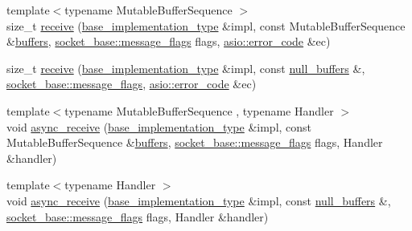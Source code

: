\begin{DoxyCompactItemize}
\item 
{\footnotesize template$<$typename Mutable\+Buffer\+Sequence $>$ }\\size\+\_\+t \hyperlink{classasio_1_1detail_1_1reactive__socket__service__base_a5b023546d28a8b111a9661f7a2ab30c6}{receive} (\hyperlink{structasio_1_1detail_1_1reactive__socket__service__base_1_1base__implementation__type}{base\+\_\+implementation\+\_\+type} \&impl, const Mutable\+Buffer\+Sequence \&\hyperlink{group__async__read_ga54dede45c3175148a77fe6635222c47d}{buffers}, \hyperlink{classasio_1_1socket__base_ac3cf77465dfedfe1979b5415cf32cc94}{socket\+\_\+base\+::message\+\_\+flags} flags, \hyperlink{classasio_1_1error__code}{asio\+::error\+\_\+code} \&ec)
\item 
size\+\_\+t \hyperlink{classasio_1_1detail_1_1reactive__socket__service__base_ad0803c43d3ce18ca81b3a4182f55f3e5}{receive} (\hyperlink{structasio_1_1detail_1_1reactive__socket__service__base_1_1base__implementation__type}{base\+\_\+implementation\+\_\+type} \&impl, const \hyperlink{classasio_1_1null__buffers}{null\+\_\+buffers} \&, \hyperlink{classasio_1_1socket__base_ac3cf77465dfedfe1979b5415cf32cc94}{socket\+\_\+base\+::message\+\_\+flags}, \hyperlink{classasio_1_1error__code}{asio\+::error\+\_\+code} \&ec)
\item 
{\footnotesize template$<$typename Mutable\+Buffer\+Sequence , typename Handler $>$ }\\void \hyperlink{classasio_1_1detail_1_1reactive__socket__service__base_a9d94d609d54b90f323d744b6d0a185ad}{async\+\_\+receive} (\hyperlink{structasio_1_1detail_1_1reactive__socket__service__base_1_1base__implementation__type}{base\+\_\+implementation\+\_\+type} \&impl, const Mutable\+Buffer\+Sequence \&\hyperlink{group__async__read_ga54dede45c3175148a77fe6635222c47d}{buffers}, \hyperlink{classasio_1_1socket__base_ac3cf77465dfedfe1979b5415cf32cc94}{socket\+\_\+base\+::message\+\_\+flags} flags, Handler \&handler)
\item 
{\footnotesize template$<$typename Handler $>$ }\\void \hyperlink{classasio_1_1detail_1_1reactive__socket__service__base_a5140d8ba31369be14ca2f181163e3ba1}{async\+\_\+receive} (\hyperlink{structasio_1_1detail_1_1reactive__socket__service__base_1_1base__implementation__type}{base\+\_\+implementation\+\_\+type} \&impl, const \hyperlink{classasio_1_1null__buffers}{null\+\_\+buffers} \&, \hyperlink{classasio_1_1socket__base_ac3cf77465dfedfe1979b5415cf32cc94}{socket\+\_\+base\+::message\+\_\+flags} flags, Handler \&handler)
\item 

\end{DoxyCompactItemize}

